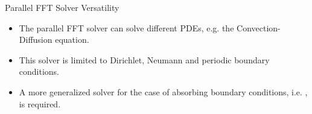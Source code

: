 \documentclass[handout]{beamer}
\begin{document}
\begin{frame}{Parallel FFT Solver Versatility}
\begin{itemize}
\item The parallel FFT solver can solve different PDEs, e.g. the Convection-Diffusion equation. \\[1em]

\item This solver is limited to Dirichlet, Neumann and periodic boundary conditions. \\[1em]

\item A more generalized solver for the case of absorbing boundary conditions, i.e. \somm, is required.

\end{itemize}



\end{frame}












%
%
\end{document}
